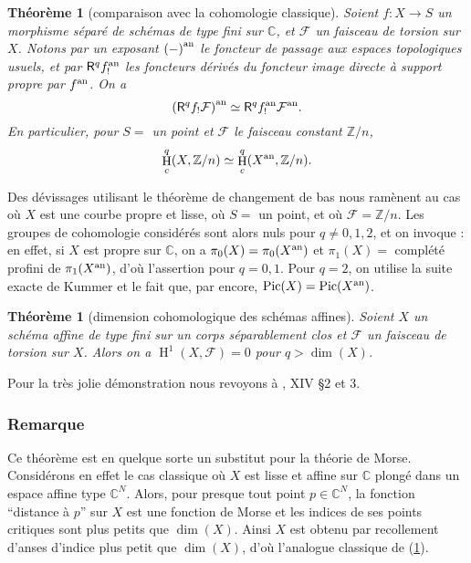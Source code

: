 \documentclass{book}
\DeclareMathOperator{\h}{H}
\DeclareMathOperator{\pic}{Pic}
\newcommand{\cF}{\mathcal{F}}
\newcommand{\dC}{\mathbb{C}}
\newcommand{\dZ}{\mathbb{Z}}
\newcommand{\an}[1]{{#1}^{\textnormal{an}}}
\newcommand{\R}{\mathsf{R}}
\newtheorem{theorem}[subsubsection]{Théorème}
\begin{document}
\begin{theorem}[comparaison avec la cohomologie classique]\label{I:4-6-3}
Soient $f:X\to S$ un morphisme séparé de schémas de type fini sur $\dC$, 
et $\cF$ un faisceau de torsion sur $X$. Notons par un exposant $\an{(-)}$ le 
foncteur de passage aux espaces topologiques usuels, et par $\R^q \an f_!$ les 
foncteurs dérivés du foncteur image directe à support propre par $\an f$. On a 
\[
  \an{(\R^q f_! \cF)} \simeq \R^q \an f_! \an \cF \text{.}
\]
En particulier, pour $S=$ un point et $\cF$ le faisceau constant $\dZ/n$, 
\[
  \h_c^q(X,\dZ/n) \simeq \h_c^q(\an X,\dZ/n)\text{.}
\]
\end{theorem}

Des dévissages utilisant le théorème de changement de bas nous ramènent au 
cas où $X$ est une courbe propre et lisse, où $S=$ un point, et où 
$\cF=\dZ/n$. Les groupes de cohomologie considérés sont alors nuls pour 
$q\ne 0,1,2$, et on invoque \cite{12}: en effet, si $X$ est propre sur $\dC$, 
on a $\pi_0(X) = \pi_0(\an X)$ et $\pi_1(X) = $ complété profini de 
$\pi_1(\an X)$, d'où l'assertion pour $q=0,1$. Pour $q=2$, on utilise la 
suite exacte de Kummer et le fait que, par \cite{12} encore, 
$\pic(X)=\pic(\an X)$. 





\begin{theorem}[dimension cohomologique des schémas affines]\label{I:4-6-4}
Soient $X$ un schéma affine de type fini sur un corps séparablement clos et 
$\cF$ un faisceau de torsion sur $X$. Alors on a $\h^1(X,\cF) = 0$ pour 
$q>\dim(X)$. 
\end{theorem}

Pour la très jolie démonstration nous revoyons à \cite{4}, XIV \S 2 et 3. 





\subsubsection{Remarque}\label{I:4-6-5}

Ce théorème est en quelque sorte un substitut pour la théorie de Morse. 
Considérons en effet le cas classique où $X$ est lisse et affine sur $\dC$ 
plongé dans un espace affine type $\dC^N$. Alors, pour presque tout point 
$p\in\dC^N$, la fonction ``distance à $p$'' sur $X$ est une fonction de Morse 
et les indices de ses points critiques sont plus petits que $\dim(X)$. Ainsi 
$X$ est obtenu par recollement d'anses d'indice plus petit que $\dim(X)$, d'où 
l'analogue classique de (\ref{I:4-6-4}). 
\end{document}
